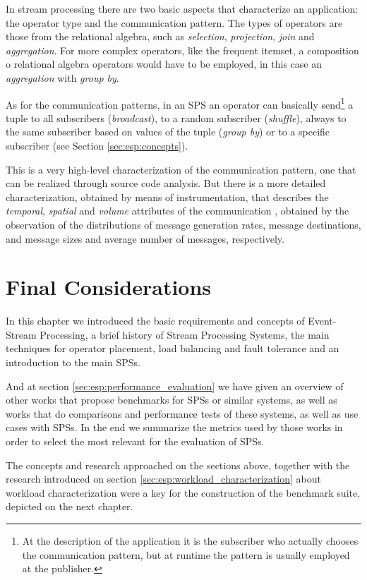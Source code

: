 \documentclass[ppgc,diss,english]{iiufrgs}
\begin{document}
In stream processing there are two basic aspects that characterize an application: the operator type and the communication pattern. The types of operators are those from the relational algebra, such as \emph{selection}, \emph{projection}, \emph{join} and \emph{aggregation}. For more complex operators, like the frequent itemset, a composition o relational algebra operators would have to be employed, in this case an \emph{aggregation} with \emph{group by}.

As for the communication patterns, in an SPS an operator can basically send\footnote{At the description of the application it is the subscriber who actually chooses the communication pattern, but at runtime the pattern is usually employed at the publisher.} a tuple to all subscribers (\emph{broadcast}), to a random subscriber (\emph{shuffle}), always to the same subscriber based on values of the tuple (\emph{group by}) or to a specific subscriber (see Section \ref{sec:esp:concepts}).

This is a very high-level characterization of the communication pattern, one that can be realized through source code analysis. But there is a more detailed characterization, obtained by means of instrumentation, that describes the \emph{temporal}, \emph{spatial} and \emph{volume} attributes of the communication \cite{kim1998characterization}, obtained by the observation of the distributions of message generation rates, message destinations, and message sizes and average number of messages, respectively.

\section{Final Considerations}

In this chapter we introduced the basic requirements and concepts of Event-Stream Processing, a brief history of Stream Processing Systems, the main techniques for operator placement, load balancing and fault tolerance and an introduction to the main SPSs.

And at section \ref{sec:esp:performance_evaluation} we have given an overview of other works that propose benchmarks for SPSs or similar systems, as well as works that do comparisons and performance tests of these systems, as well as use cases with SPSs. In the end we summarize the metrics used by those works in order to select the most relevant for the evaluation of SPSs.

The concepts and research approached on the sections above, together with the research introduced on section \ref{sec:esp:workload_characterization} about workload characterization were a key for the construction of the benchmark suite, depicted on the next chapter.
\end{document}
